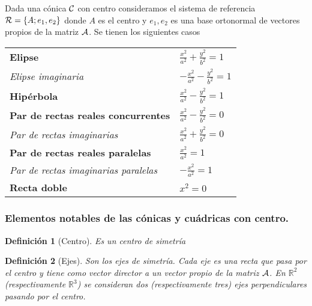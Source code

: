 \documentclass[11pt, a4paper, titlepage]{article}
\theoremstyle{theorem-style}
\theoremstyle{definition-style}
\newtheorem*{ndef}{Definición}
\theoremstyle{remark-style}
\theoremstyle{example-style}
\begin{document}
\vspace{.5cm}

Dada una c\'onica $\cal C$ con centro consideramos el sistema de referencia 
${\cal R}=\{A; e_1,e_2\}$ donde $A$ 
es el centro y $e_1,e_2$ es una base ortonormal de vectores propios de la matriz $\cal A$. Se tienen los siguientes casos

\vspace{.8cm}

\begin{tabular}{ll}
{\bf Elipse} \hspace{5cm} & 
$
\frac{{x}^2}{a^2} + \frac{{y}^2}{b^2} = 1
$
\vspace{.4cm}
\\
{\it Elipse imaginaria}  &
$
-\frac{{x}^2}{a^2} - \frac{{y}^2}{b^2} = 1
$
\vspace{.4cm}
\\
{\bf  Hip\'erbola}  &
$
\frac{{x}^2}{a^2} - \frac{{y}^2}{b^2} = 1
$
\vspace{.4cm}
\\
{\bf  Par de rectas reales concurrentes}  &
$
\frac{{x}^2}{a^2} - \frac{{y}^2}{b^2}=0
$
\vspace{.4cm}
\\
{\it Par de rectas imaginarias} &
$
\frac{{x}^2}{a^2} + \frac{{y}^2}{b^2}=0
$
\vspace{.4cm}
\\
{\bf  Par de rectas reales paralelas}  &
$
\frac{{x}^2}{a^2}=1
$
\vspace{.4cm}
\\
{\it Par de rectas imaginarias paralelas}  &
$
-\frac{{x}^2}{a^2} = 1
$
\vspace{.4cm}
\\
{\bf  Recta doble}  &
$
{{x}^2} = 0
$
\vspace{.3cm}
\\
\end{tabular}
\subsubsection{\bf  Elementos notables de las c\'onicas y cu\'adricas con centro.}

\begin{ndef}[Centro]
	Es un centro de simetría
\end{ndef}



\begin{ndef}[Ejes]
	 Son los ejes de simetr\'ia. Cada eje es una recta que pasa por el centro y tiene como vector director a un vector propio de la matriz $\cal A$. En $\mathbb{R}^2$ (respectivamente $\mathbb{R}^3$) se consideran dos (respectivamente tres)  ejes perpendiculares pasando por el centro.
\end{ndef}
\end{document}
